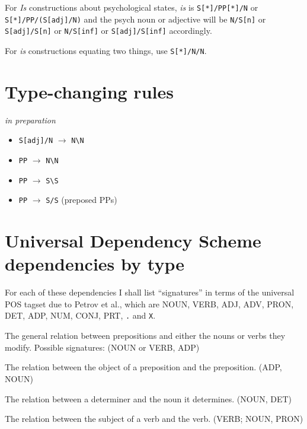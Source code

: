 \documentclass[a4paper]{article}
\begin{document}
 For \textit{Is} constructions about psychological states, \textit{is} is \texttt{S[*]/PP[*]/N} or \texttt{S[*]/PP/(S[adj]/N)} and the psych noun or adjective will be \texttt{N/S[n]} or \texttt{S[adj]/S[n]} or \texttt{N/S[inf]} or \texttt{S[adj]/S[inf]} accordingly.

 For \textit{is} constructions equating two things, use \texttt{S[*]/N/N}. 

\section{Type-changing rules}

\textit{in preparation}

\begin{itemize}
\item \texttt{S[adj]/N} $\rightarrow$ \texttt{N\textbackslash N}
\item \texttt{PP} $\rightarrow$ \texttt{N\textbackslash N}
\item \texttt{PP} $\rightarrow$ \texttt{S\textbackslash S}
\item \texttt{PP} $\rightarrow$ \texttt{S/S} (preposed PPs)
\end{itemize}














\section{Universal Dependency Scheme dependencies by type}

 For each of these dependencies I shall list ``signatures'' in terms of the universal POS tagset due to Petrov et al., which are NOUN, VERB, ADJ, ADV, PRON, DET, ADP, NUM, CONJ, PRT, \texttt{.} and \texttt{X}.

 The general relation between prepositions and either the nouns or verbs they modify. Possible signatures: (NOUN or VERB, ADP)

 The relation between the object of a preposition and the preposition. (ADP, NOUN)

 The relation between a determiner and the noun it determines. (NOUN, DET)

 The relation between the subject of a verb and the verb. (VERB; NOUN, PRON)
\end{document}

